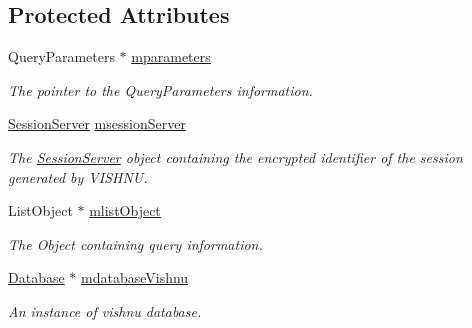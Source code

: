 \subsection*{Protected Attributes}
\begin{DoxyCompactItemize}
\item 
\hypertarget{classQueryServer_a4cf1497aa9c56864e8119645ccc42dc7}{
QueryParameters $\ast$ \hyperlink{classQueryServer_a4cf1497aa9c56864e8119645ccc42dc7}{mparameters}}
\label{classQueryServer_a4cf1497aa9c56864e8119645ccc42dc7}

\begin{DoxyCompactList}\small\item\em The pointer to the QueryParameters information. \item\end{DoxyCompactList}\item 
\hypertarget{classQueryServer_aca7fcfb763b77c52c23a587f698caf50}{
\hyperlink{classSessionServer}{SessionServer} \hyperlink{classQueryServer_aca7fcfb763b77c52c23a587f698caf50}{msessionServer}}
\label{classQueryServer_aca7fcfb763b77c52c23a587f698caf50}

\begin{DoxyCompactList}\small\item\em The \hyperlink{classSessionServer}{SessionServer} object containing the encrypted identifier of the session generated by VISHNU. \item\end{DoxyCompactList}\item 
\hypertarget{classQueryServer_a6b31d48f2ebadfe86d71999efde3679e}{
ListObject $\ast$ \hyperlink{classQueryServer_a6b31d48f2ebadfe86d71999efde3679e}{mlistObject}}
\label{classQueryServer_a6b31d48f2ebadfe86d71999efde3679e}

\begin{DoxyCompactList}\small\item\em The Object containing query information. \item\end{DoxyCompactList}\item 
\hypertarget{classQueryServer_ad6deb85a0f4526edbdfd97269f2acec5}{
\hyperlink{classDatabase}{Database} $\ast$ \hyperlink{classQueryServer_ad6deb85a0f4526edbdfd97269f2acec5}{mdatabaseVishnu}}
\label{classQueryServer_ad6deb85a0f4526edbdfd97269f2acec5}

\begin{DoxyCompactList}\small\item\em An instance of vishnu database. \item\end{DoxyCompactList}\end{DoxyCompactItemize}


